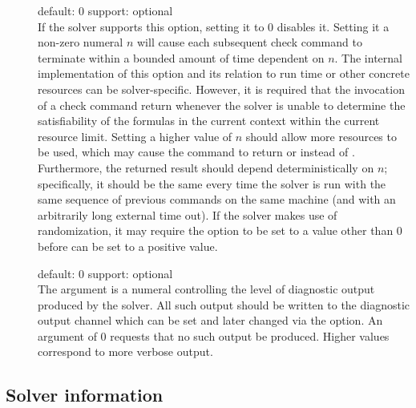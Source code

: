 \begin{description}
\item[] 
\quad default: $0$
\quad support: optional
\\
If the solver supports this option, setting it to $0$ disables it.
Setting it a non-zero numeral $n$ will cause each subsequent check command 
to terminate within a bounded amount of time dependent on $n$.
The internal implementation of this option and its relation to run time or 
other concrete resources can be solver-specific.
However, it is required that the invocation of a check command return 
 whenever the solver is unable to determine the satisfiability 
of the formulas in the current context within the current resource limit. 
Setting a higher value of $n$ should allow more resources to be used, 
which may cause the command to return  or  instead 
of . 
Furthermore, the returned result should depend deterministically on $n$;
specifically, it should be the same every time the solver is run 
with the same sequence of previous commands on the same machine 
(and with an arbitrarily long external time out). 
If the solver makes use of randomization, it may require 
the  option to be set to a value other than $0$ 
before  can be set to a positive value.

\item[] 
\quad default: $0$
\quad support: optional
\\
The argument is a numeral controlling the level of diagnostic output produced
by the solver.  
All such output should be written to the diagnostic output channel
which can be set and later changed via the  option.  
An argument of $0$ requests that no such output be produced.  
Higher values correspond to more verbose output.
\end{description}

\subsection{Solver information}   \label{sec:get-info}

